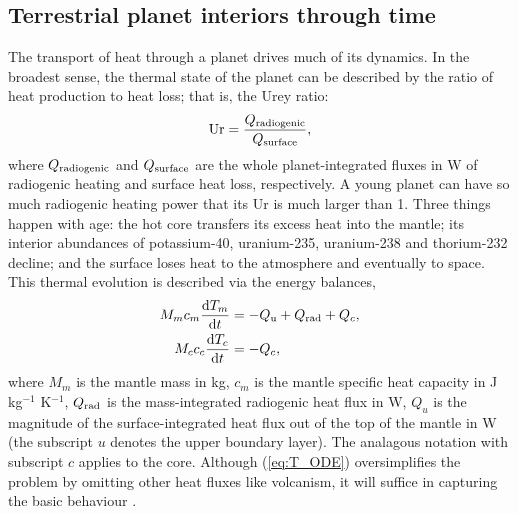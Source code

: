 \subsection{Terrestrial planet interiors through time}


The transport of heat through a planet drives much of its dynamics. In the broadest sense, the thermal state of the planet can be described by the ratio of heat production to heat loss; that is, the Urey ratio:
\begin{align}\label{eq:Ur}
{\rm Ur} = \frac{Q_{\rm radiogenic}}{Q_{\rm surface}},
\end{align}
where $Q_{\rm radiogenic}$ and $Q_{\rm surface}$ are the whole planet-integrated fluxes in W of radiogenic heating and surface heat loss, respectively. A young planet can have so much radiogenic heating power that its Ur is much larger than 1. Three things happen with age: the hot core transfers its excess heat into the mantle; its interior abundances of potassium-40, uranium-235, uranium-238 and thorium-232 decline; and the surface loses heat to the atmosphere and eventually to space. This thermal evolution is described via the energy balances,
\begin{align}\label{eq:T_ODE}
\begin{split}
M_m c_{m} \frac{{\rm d}T_m}{{\rm d}t} &= -Q_{\rm u} + Q_{\rm rad} + Q_c, \\
M_c c_{c} \frac{{\rm d}T_c}{{\rm d}t} &= -Q_c,
\end{split}
\end{align}
where $M_m$ is the mantle mass in kg, $c_{m}$ is the mantle specific heat capacity in J kg$^{-1}$ K$^{-1}$, $Q_{\rm rad}$ is the mass-integrated radiogenic heat flux in W, $Q_{u}$ is the magnitude of the surface-integrated heat flux out of the top of the mantle in W (the subscript $u$ denotes the upper boundary layer). The analagous notation with subscript $c$ applies to the core. Although (\ref{eq:T_ODE}) oversimplifies the problem by omitting other heat fluxes like volcanism, it will suffice in capturing the basic behaviour \citep{Jaupart2015}.



